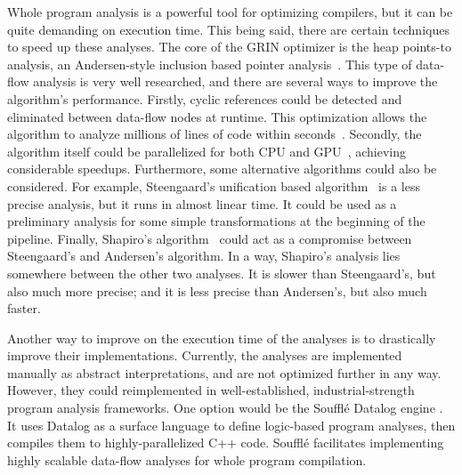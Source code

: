 \documentclass[main.tex]{subfiles}
\begin{document}
  Whole program analysis is a powerful tool for optimizing compilers, but it can be quite demanding on execution time. This being said, there are certain techniques to speed up these analyses. The core of the GRIN optimizer is the heap points-to analysis, an Andersen-style inclusion based pointer analysis~\cite{andersen-ptr}. This type of data-flow analysis is very well researched, and there are several ways to improve the algorithm's performance. Firstly, cyclic references could be detected and eliminated between data-flow nodes at runtime. This optimization allows the algorithm to analyze millions of lines of code within seconds~\cite{andersen-opt}. Secondly, the algorithm itself could be parallelized for both CPU and GPU~\cite{andersen-gpu}, achieving considerable speedups. Furthermore, some alternative algorithms could also be considered. For example, Steengaard's unification based algorithm~\cite{steensgaard-ptr} is a less precise analysis, but it runs in almost linear time. It could be used as a preliminary analysis for some simple transformations at the beginning of the pipeline. Finally, Shapiro's algorithm~\cite{shapiro-ptr} could act as a compromise between Steengaard's and Andersen's algorithm. In a way, Shapiro's analysis lies somewhere between the other two analyses. It is slower than Steengaard's, but also much more precise; and it is less precise than Andersen's, but also much faster.
  
  Another way to improve on the execution time of the analyses is to drastically improve their implementations. Currently, the analyses are implemented manually as abstract interpretations, and are not optimized further in any way. However, they could reimplemented in well-established, industrial-strength program analysis frameworks. One option would be the Soufflé Datalog engine \cite{souffle}. It uses Datalog as a surface language to define logic-based program analyses, then compiles them to highly-parallelized C++ code. Soufflé facilitates implementing highly scalable data-flow analyses for whole program compilation.
	
\end{document}
